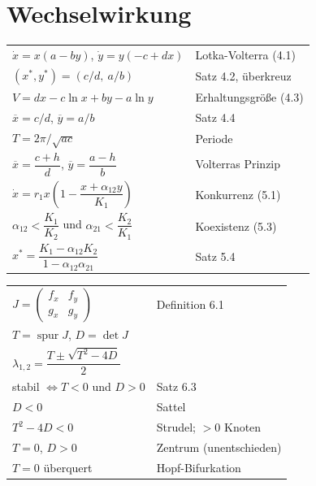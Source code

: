 \section{Wechselwirkung}

\begin{merksatz}
\begin{center}
{\small
\renewcommand{\arraystretch}{1.62}
\begin{tabular}{@{}P{4.6cm}P{4.0cm}@{}}
\toprule
$\dot x = x(a-by)$, $\dot y = y(-c+dx)$ & Lotka-Volterra (4.1)\\
$(x^{*},y^{*}) = (c/d,\ a/b)$ & Satz 4.2, überkreuz\\
$V = dx - c\ln x + by - a\ln y$ & Erhaltungsgröße (4.3)\\
$\overline x = c/d$, $\overline y = a/b$ & Satz 4.4\\
$T = 2\pi/\sqrt{ac}$ & Periode\\
$\overline x = \dfrac{c+h}{d}$, $\overline y = \dfrac{a-h}{b}$ & Volterras Prinzip\\
$\dot x = r_1x\left(1-\dfrac{x+\alpha_{12}y}{K_1}\right)$ & Konkurrenz (5.1)\\
$\alpha_{12} < \dfrac{K_1}{K_2}$ und $\alpha_{21} < \dfrac{K_2}{K_1}$ & Koexistenz (5.3)\\
$x^{*} = \dfrac{K_1-\alpha_{12}K_2}{1-\alpha_{12}\alpha_{21}}$ & Satz 5.4\\
\bottomrule
\end{tabular}}
\end{center}
\end{merksatz}

\begin{merksatz}
\begin{center}
{\small
\renewcommand{\arraystretch}{1.62}
\begin{tabular}{@{}P{4.4cm}P{4.2cm}@{}}
\toprule
$J = \begin{pmatrix} f_x & f_y\\ g_x & g_y\end{pmatrix}$ & Definition 6.1\\
$T = \operatorname{spur}J$, $D = \det J$ & \\
$\lambda_{1,2} = \dfrac{T\pm\sqrt{T^2-4D}}{2}$ & \\
stabil $\iff T<0$ und $D>0$ & Satz 6.3\\
$D<0$ & Sattel\\
$T^2-4D<0$ & Strudel; $>0$ Knoten\\
$T=0$, $D>0$ & Zentrum (unentschieden)\\
$T=0$ überquert & Hopf-Bifurkation\\
\bottomrule
\end{tabular}}
\end{center}
\end{merksatz}

